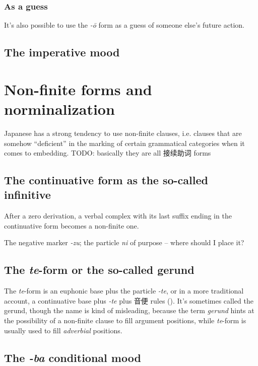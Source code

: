 \documentclass[UTF8, a4paper, oneside, scheme=plain]{ctexrep}
\newcommand*{\term}[1]{\emph{#1}}
\newcommand{\corpus}[1]{\emph{#1}}
\begin{document}
\subsubsection{As a guess}

It's also possible to use the \corpus{-\={o}} form as a guess of someone else's future action.

\subsection{The imperative mood}\label{sec:imperative}

\section{Non-finite forms and norminalization}\label{sec:non-finite}

Japanese has a strong tendency to use non-finite clauses,
i.e. clauses that are somehow ``deficient'' in the marking of certain grammatical categories 
when it comes to embedding.
TODO: basically they are all 接续助词 forms

\subsection{The continuative form as the so-called infinitive}

After a zero derivation, 
a verbal complex with its last suffix ending in the continuative form 
becomes a non-finite one.

The negative marker \corpus{-zu}; the particle \corpus{ni} of purpose -- where should I place it?

\subsection{The \corpus{te}-form or the so-called gerund}\label{sec:te-form}

The \corpus{te}-form is an euphonic base plus the particle \corpus{-te},
or in a more traditional account,
a continuative base plus \corpus{-te} plus 音便 rules ().
It's sometimes called the gerund,
though the name is kind of misleading,
because the term \term{gerund} hints at the possibility of a non-finite clause to fill argument positions,
while \corpus{te}-form is usually used to fill \emph{adverbial} positions.

\subsection{The \corpus{-ba} conditional mood} \label{sec:eba-form}
\end{document}
